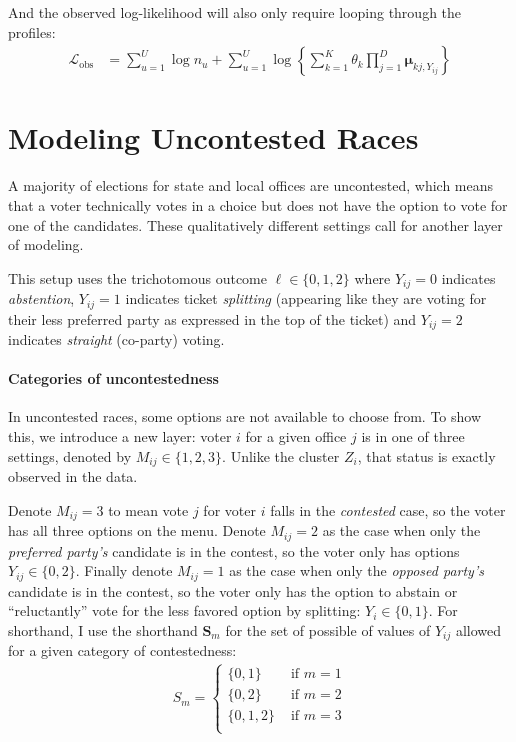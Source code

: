 \documentclass[11pt]{article}
\begin{document}
And the observed log-likelihood will also only require looping through the profiles:
\begin{align}
\mathcal{L}_{\text{obs}} &= \sum^{U}_{u=1}\log n_u + \sum^{U}_{u=1}\log\left\{\sum^{K}_{k=1}\theta_k \prod^{D}_{j=1}\bm{\mu}_{kj,Y_{ij}}\right\}
\end{align}


\section{Modeling Uncontested Races} 

A majority of elections for state and local offices are uncontested, which means that a voter technically votes in a choice but does not have the option to vote for one of the candidates. These qualitatively different settings call for another layer of modeling. 

This setup uses the trichotomous outcome \(\ell \in \{0, 1,  2\}\) where \(Y_{ij} = 0\) indicates \emph{abstention}, \(Y_{ij} = 1\) indicates ticket \emph{splitting} (appearing like they are voting for their less preferred party as expressed in the top of the ticket) and \(Y_{ij} = 2\) indicates \emph{straight} (co-party) voting.  

\paragraph{Categories of uncontestedness} In uncontested races, some options are not available to choose from. To show this, we introduce a new layer: voter \(i\) for a given office \(j\) is in one of three settings, denoted by \(M_{ij} \in \{1, 2, 3\}\). Unlike the cluster \(Z_i\), that status is exactly observed in the data. 

Denote \(M_{ij} = 3\) to mean vote \(j\) for voter \(i\) falls in the \emph{contested} case, so the voter has all three options on the menu. Denote \(M_{ij} = 2\) as the case when only the \emph{preferred party's} candidate is in the contest, so the voter only has options \(Y_{ij} \in \{0, 2\}\). Finally denote \(M_{ij} = 1\) as the case when only the \emph{opposed party's} candidate is in the contest, so the voter only has the option to abstain or ``reluctantly'' vote for the less favored option by splitting: \(Y_{i} \in \{0, 1\}\). For shorthand, I use the shorthand \(\bm{S}_{m}\) for the set of possible of values of \(Y_{ij}\) allowed for a given category of contestedness:
\begin{align*}
S_{m} = \begin{cases}
\{0, 1\} & \text{~if~} m = 1\\
\{0, 2\}  & \text{~if~} m = 2\\
\{0, 1, 2\} & \text{~if~} m = 3\\
\end{cases}
\end{align*}
\end{document}
